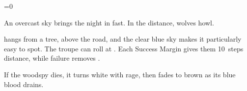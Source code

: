 \ifnum\value{cycle}=0


\begin{boxtext}
  An overcast sky brings the night in fast.
  In the distance, wolves howl.
\end{boxtext}

 hangs from a tree, above the road, and the clear blue sky makes it particularly easy to spot.
The troupe can roll  at \tn[10].
Each Success Margin gives them 10~\glspl{step} distance, while failure removes .

\woodspy

If the \gls{woodspy} dies, it turns white with rage, then fades to brown as its blue blood drains.

\fi

